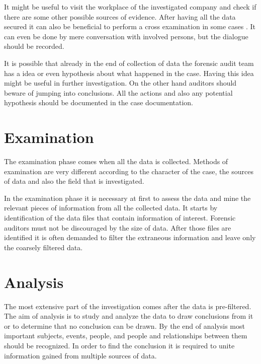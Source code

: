 It might be useful to visit the workplace of the investigated company and check if there are some other possible sources of evidence. After having all the data secured it can also be beneficial to perform a cross examination in some cases . It can even be done by mere conversation with involved persons, but the dialogue should be recorded.

It is possible that already in the end of collection of data the forensic audit team has a idea or even hypothesis about what happened in the case. Having this idea might be useful in further investigation. On the other hand auditors should beware of jumping into conclusions. All the actions and also any potential hypothesis should be documented in the case documentation. 

\section{Examination}

The examination phase comes when all the data is collected. Methods of examination are very different according to the character of the case, the sources of data and also the field that is investigated. 

In the examination phase it is necessary at first to assess the data and mine the relevant pieces of information from all the collected data. It starts by identification of the data files that contain information of interest. Forensic auditors must not be discouraged by the size of data. After those files are identified it is often demanded to filter the extraneous information and leave only the coarsely filtered data. 

\section{Analysis}

The most extensive part of the investigation comes after the data is pre-filtered. The aim of analysis is to study and analyze the data to draw conclusions from it or to determine that no conclusion can be drawn. By the end of analysis most important subjects, events, people, and people and relationships between them should be recognized. In order to find the conclusion it is required to unite information gained from multiple sources of data.

